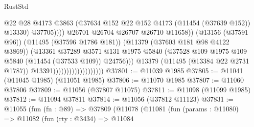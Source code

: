 \begin{lexlean}{RustStd}
\begin{coremodule}
                                                        @22
                                                        @28
                                                        @4173
                                                        @3863
                                                        (@37634
                                                          @152
                                                          @22
                                                          @152
                                                          @4173
                                                          (@11454 (@37639 @152))
                                                          @13330)
                                                        @37705))))
                                                @26701
                                                @26704
                                                @26707
                                                @26710
                                                @11658))
                                            (@13156 (@37591 @96))
                                            (@11495 (@37596 @1786 @181))
                                            (@11379 (@37603 @181 @98 @4122 @3869))
                                            (@13361
                                              @37289
                                              @3571
                                              @131
                                              @1975
                                              @5840
                                              (@37528
                                                @109
                                                @1975
                                                @109
                                                @5840
                                                (@11454 (@37533 @109))
                                                @24756)))
                                          @13379
                                          (@11495 (@13384 @22 @2731 @1787))
                                          @13391)))))))))))))))))))
@37801 := @11039 @1985
@37805 := @11041 (@11045 @1985) (@11051 @1985)
@37806 := @11070 @1985
@37807 := @11060 @37806
@37809 := @11056 (@37807 @11075)
@37811 := @11098 (@11099 @1985)
@37812 := @11094 @37811
@37814 := @11056 (@37812 @11123)
@37831 := @11055
    (fun (fn : @89) =>
    @37809
      (@11078
        (@11081
          (fun (params : @11080) =>
          @11082
            (fun (rty : @3434) =>
            @11084

\end{coremodule}
\end{lexlean}

